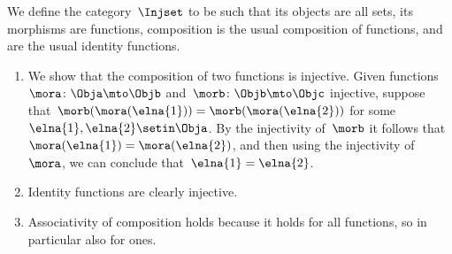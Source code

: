 \begin{solution}
    We define the category~$\Injset$ to be such that its objects are all sets, its morphisms are  functions, composition is the usual composition of functions, and    are the usual identity functions.
    \begin{enumerate}
        \item We show that the composition of two  functions is injective.
              Given functions~$\mora \colon \Obja \mto \Objb$ and~$\morb \colon \Objb \mto \Objc$ injective, suppose that~$\morb(\mora (\elna{1})) = \morb(\mora (\elna{2}))$ for some~$\elna{1}, \elna{2} \setin \Obja$.
              By the injectivity of~$\morb$ it follows that~$\mora (\elna{1}) = \mora (\elna{2})$, and then using the injectivity of~$\mora$, we can conclude that~$\elna{1} = \elna{2}$.
        \item Identity functions are clearly injective.
        \item Associativity of composition holds because it holds for all functions, so in particular also for  ones.
    \end{enumerate}
\end{solution}

